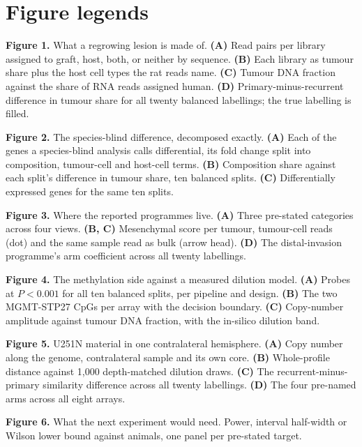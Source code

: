 \section*{Figure legends}

\textbf{Figure 1.} What a regrowing lesion is made of. \textbf{(A)} Read pairs per library assigned to graft, host,
both, or neither by sequence. \textbf{(B)} Each library as tumour share plus the host cell types the rat reads name.
\textbf{(C)} Tumour DNA fraction against the share of RNA reads assigned human. \textbf{(D)} Primary-minus-recurrent
difference in tumour share for all twenty balanced labellings; the true labelling is filled.

\textbf{Figure 2.} The species-blind difference, decomposed exactly. \textbf{(A)} Each of the
 genes a species-blind analysis calls differential, its fold change split into
composition, tumour-cell and host-cell terms. \textbf{(B)} Composition share against each split's difference in
tumour share, ten balanced splits. \textbf{(C)} Differentially expressed genes for the same ten splits.

\textbf{Figure 3.} Where the reported programmes live. \textbf{(A)} Three pre-stated categories across four views.
\textbf{(B, C)} Mesenchymal score per tumour, tumour-cell reads (dot) and the same sample read as bulk (arrow head).
\textbf{(D)} The distal-invasion programme's arm coefficient across all twenty labellings.

\textbf{Figure 4.} The methylation side against a measured dilution model. \textbf{(A)} Probes at $P<0.001$ for all
ten balanced splits, per pipeline and design. \textbf{(B)} The two MGMT-STP27 CpGs per array with the decision
boundary. \textbf{(C)} Copy-number amplitude against tumour DNA fraction, with the in-silico dilution band.

\textbf{Figure 5.} U251N material in one contralateral hemisphere. \textbf{(A)} Copy number along the genome,
contralateral sample and its own core. \textbf{(B)} Whole-profile distance against 1,000 depth-matched dilution
draws. \textbf{(C)} The recurrent-minus-primary similarity difference across all twenty labellings. \textbf{(D)} The
four pre-named arms across all eight arrays.

\textbf{Figure 6.} What the next experiment would need. Power, interval half-width or Wilson lower bound against
animals, one panel per pre-stated target.

